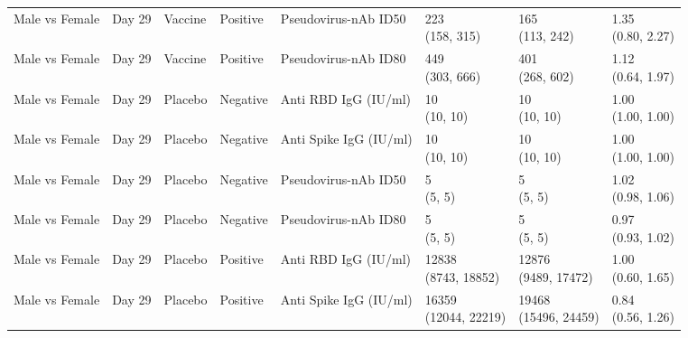 \documentclass[]{book}
\theoremstyle{definition}
\theoremstyle{definition}
\theoremstyle{definition}
\newcommand{\1}{\mathbbm{1}}
\begin{document}
\begin{landscape}
\begin{ThreePartTable}
\begin{longtable}[t]{>{\raggedright\arraybackslash}p{2.7cm}lllllll}
Male vs Female & Day 29 & Vaccine & Positive & Pseudovirus-nAb ID50 & \makecell[l]{223\\(158, 315)} & \makecell[l]{165\\(113, 242)} & \makecell[l]{1.35\\(0.80, 2.27)}\\
\addlinespace
Male vs Female & Day 29 & Vaccine & Positive & Pseudovirus-nAb ID80 & \makecell[l]{449\\(303, 666)} & \makecell[l]{401\\(268, 602)} & \makecell[l]{1.12\\(0.64, 1.97)}\\
Male vs Female & Day 29 & Placebo & Negative & Anti RBD IgG (IU/ml) & \makecell[l]{10\\(10, 10)} & \makecell[l]{10\\(10, 10)} & \makecell[l]{1.00\\(1.00, 1.00)}\\
Male vs Female & Day 29 & Placebo & Negative & Anti Spike IgG (IU/ml) & \makecell[l]{10\\(10, 10)} & \makecell[l]{10\\(10, 10)} & \makecell[l]{1.00\\(1.00, 1.00)}\\
Male vs Female & Day 29 & Placebo & Negative & Pseudovirus-nAb ID50 & \makecell[l]{5\\(5, 5)} & \makecell[l]{5\\(5, 5)} & \makecell[l]{1.02\\(0.98, 1.06)}\\
Male vs Female & Day 29 & Placebo & Negative & Pseudovirus-nAb ID80 & \makecell[l]{5\\(5, 5)} & \makecell[l]{5\\(5, 5)} & \makecell[l]{0.97\\(0.93, 1.02)}\\
\addlinespace
Male vs Female & Day 29 & Placebo & Positive & Anti RBD IgG (IU/ml) & \makecell[l]{12838\\(8743, 18852)} & \makecell[l]{12876\\(9489, 17472)} & \makecell[l]{1.00\\(0.60, 1.65)}\\
Male vs Female & Day 29 & Placebo & Positive & Anti Spike IgG (IU/ml) & \makecell[l]{16359\\(12044, 22219)} & \makecell[l]{19468\\(15496, 24459)} & \makecell[l]{0.84\\(0.56, 1.26)}\\

\end{longtable}
\end{ThreePartTable}
\end{landscape}
\end{document}
